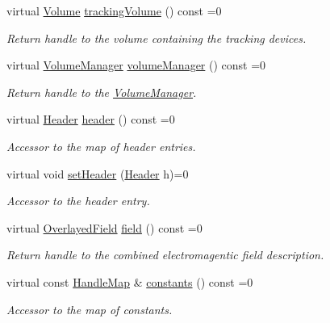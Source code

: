 \begin{DoxyCompactItemize}
virtual \hyperlink{class_d_d4hep_1_1_geometry_1_1_volume}{Volume} \hyperlink{class_d_d4hep_1_1_geometry_1_1_l_c_d_d_a351b289056485f960e9121382018c92b}{tracking\+Volume} () const =0
\begin{DoxyCompactList}\small\item\em Return handle to the volume containing the tracking devices. \end{DoxyCompactList}\item 
virtual \hyperlink{class_d_d4hep_1_1_geometry_1_1_volume_manager}{Volume\+Manager} \hyperlink{class_d_d4hep_1_1_geometry_1_1_l_c_d_d_a2112b2267f5f07ecc94e909d696ffdbd}{volume\+Manager} () const =0
\begin{DoxyCompactList}\small\item\em Return handle to the \hyperlink{class_d_d4hep_1_1_geometry_1_1_volume_manager}{Volume\+Manager}. \end{DoxyCompactList}\item 
virtual \hyperlink{class_d_d4hep_1_1_geometry_1_1_header}{Header} \hyperlink{class_d_d4hep_1_1_geometry_1_1_l_c_d_d_ad09f49fc86a5b286ae55901e2b169d7c}{header} () const =0
\begin{DoxyCompactList}\small\item\em Accessor to the map of header entries. \end{DoxyCompactList}\item 
virtual void \hyperlink{class_d_d4hep_1_1_geometry_1_1_l_c_d_d_a9927ac6aeae1dad18e22413deba9aa65}{set\+Header} (\hyperlink{class_d_d4hep_1_1_geometry_1_1_header}{Header} h)=0
\begin{DoxyCompactList}\small\item\em Accessor to the header entry. \end{DoxyCompactList}\item 
virtual \hyperlink{class_d_d4hep_1_1_geometry_1_1_overlayed_field}{Overlayed\+Field} \hyperlink{class_d_d4hep_1_1_geometry_1_1_l_c_d_d_a62750fbd02e0f4e06c570d00dc9eb2ca}{field} () const =0
\begin{DoxyCompactList}\small\item\em Return handle to the combined electromagentic field description. \end{DoxyCompactList}\item 
virtual const \hyperlink{class_d_d4hep_1_1_geometry_1_1_l_c_d_d_a05cb11e7355772c7b0794bcca59bf477}{Handle\+Map} \& \hyperlink{class_d_d4hep_1_1_geometry_1_1_l_c_d_d_a14d6ac1a5de3cd514372ab8717b6420e}{constants} () const =0
\begin{DoxyCompactList}\small\item\em Accessor to the map of constants. \end{DoxyCompactList}\item 

\end{DoxyCompactItemize}
